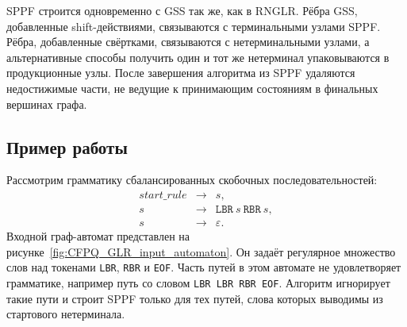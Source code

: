 \begin{algorithm}
    \caption{Построение GSS}
    \label{algo:CFPQ_GLR_gss_construction}
\end{algorithm}

SPPF строится одновременно с GSS так же, как в RNGLR.
Рёбра GSS, добавленные shift-действиями, связываются с терминальными узлами SPPF.
Рёбра, добавленные свёртками, связываются с нетерминальными узлами, а альтернативные способы получить один и тот же нетерминал упаковываются в продукционные узлы.
После завершения алгоритма из SPPF удаляются недостижимые части, не ведущие к принимающим состояниям в финальных вершинах графа.

\subsection{Пример работы}
\label{subsec:CFPQ_GLR_example}

Рассмотрим грамматику сбалансированных скобочных последовательностей:
\[
\begin{array}{rcl}
    start\_rule & \to & s, \\
    s & \to & \texttt{LBR}\ s\ \texttt{RBR}\ s, \\
    s & \to & \varepsilon.
\end{array}
\]
Входной граф-автомат представлен на рисунке~\ref{fig:CFPQ_GLR_input_automaton}.
Он задаёт регулярное множество слов над токенами \texttt{LBR}, \texttt{RBR} и \texttt{EOF}.
Часть путей в этом автомате не удовлетворяет грамматике, например путь со словом \texttt{LBR LBR RBR EOF}.
Алгоритм игнорирует такие пути и строит SPPF только для тех путей, слова которых выводимы из стартового нетерминала.

